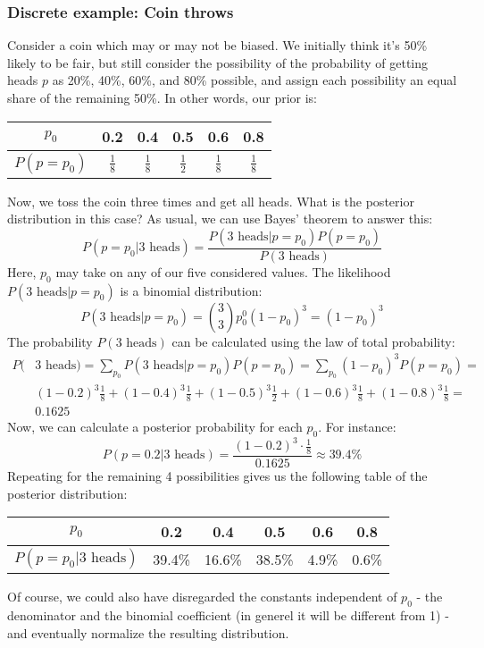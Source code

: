 \documentclass[12pt, a4paper]{article}
\begin{document}
\subsubsection{Discrete example: Coin throws}
Consider a coin which may or may not be biased. We initially think it's 50\% likely to be fair, but still consider the possibility of the probability of getting heads $p$ as 20\%, 40\%, 60\%, and 80\% possible, and assign each possibility an equal share of the remaining 50\%. In other words, our prior is:
\begin{center}
\begin{tabular}{ c | c c c c c }
 $p_0$		& 0.2 & 0.4 & 0.5 & 0.6	& 0.8 \\
 \hline
 $P(p=p_0)$	& $\frac{1}{8}$ & $\frac{1}{8}$ & $\frac{1}{2}$	& $\frac{1}{8}$ & $\frac{1}{8}$\\      
\end{tabular}
\end{center}
Now, we toss the coin three times and get all heads. What is the posterior distribution in this case? As usual, we can use Bayes' theorem to answer this:
\begin{equation}
P(p=p_0|3\textrm{ heads})=\frac{P(3\textrm{ heads}|p=p_0)P(p=p_0)}{P(3\textrm{ heads})}
\end{equation}
Here, $p_0$ may take on any of our five considered values. The likelihood $P(3\textrm{ heads}|p=p_0)$ is a binomial distribution:
\begin{equation}
P(3\textrm{ heads}|p=p_0)=\binom{3}{3}p_0^0(1-p_0)^3=(1-p_0)^3
\end{equation}
The probability $P(3\textrm{ heads})$ can be calculated using the law of total probability:
\begin{align*}
P(&3\textrm{ heads})=\sum_{p_0}P(3\textrm{ heads}|p=p_0)P(p=p_0)=\sum_{p_0}(1-p_0)^3 P(p=p_0)=\\
&(1-0.2)^3\frac{1}{8}+(1-0.4)^3\frac{1}{8}+(1-0.5)^3\frac{1}{2}+(1-0.6)^3\frac{1}{8}+(1-0.8)^3\frac{1}{8}=\\
&0.1625
\end{align*}
Now, we can calculate a posterior probability for each $p_0$. For instance:
\begin{equation}
P(p=0.2|3\textrm{ heads})=\frac{(1-0.2)^3\cdot\frac{1}{8}}{0.1625}\approx 39.4\%
\end{equation}
Repeating for the remaining 4 possibilities gives us the following table of the posterior distribution:
\begin{center}
\begin{tabular}{ c | c c c c c }
 $p_0$		& 0.2 & 0.4 & 0.5 & 0.6	& 0.8 \\
 \hline
 $P(p=p_0|3\textrm{ heads})$ & 39.4\% & 16.6\% & 38.5\%	& 4.9\% & 0.6\%\\      
\end{tabular}
\end{center}
Of course, we could also have disregarded the constants independent of $p_0$ - the denominator and the binomial coefficient (in generel it will be different from 1) - and eventually normalize the resulting distribution.
\end{document}
